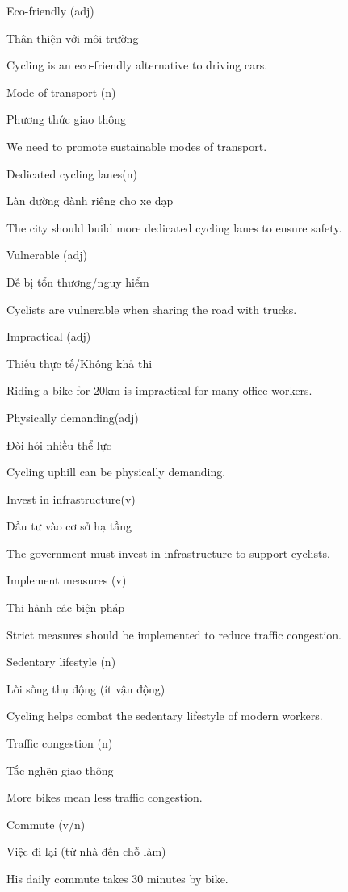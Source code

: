 \documentclass{../templateWriting/cdwriting}
\begin{document}
Eco-friendly (adj)

Thân thiện với môi trường

Cycling is an eco-friendly alternative to driving cars.

Mode of transport (n)

Phương thức giao thông

We need to promote sustainable modes of transport.

Dedicated cycling lanes(n)

Làn đường dành riêng cho xe đạp

The city should build more dedicated cycling lanes to ensure safety.

Vulnerable (adj)

Dễ bị tổn thương/nguy hiểm

Cyclists are vulnerable when sharing the road with trucks.

Impractical (adj)

Thiếu thực tế/Không khả thi

Riding a bike for 20km is impractical for many office workers.

Physically demanding(adj)

Đòi hỏi nhiều thể lực

Cycling uphill can be physically demanding.

Invest in infrastructure(v)

Đầu tư vào cơ sở hạ tầng

The government must invest in infrastructure to support cyclists.

Implement measures (v)

Thi hành các biện pháp

Strict measures should be implemented to reduce traffic congestion.

Sedentary lifestyle (n)

Lối sống thụ động (ít vận động)

Cycling helps combat the sedentary lifestyle of modern workers.

Traffic congestion (n)

Tắc nghẽn giao thông

More bikes mean less traffic congestion.

Commute (v/n)

Việc đi lại (từ nhà đến chỗ làm)

His daily commute takes 30 minutes by bike.
\end{document}
